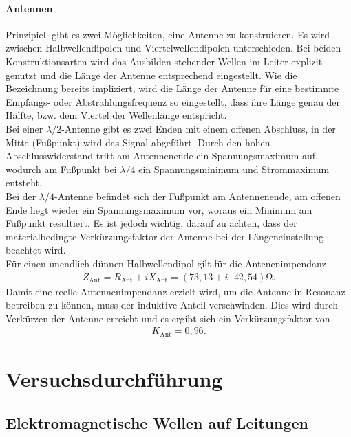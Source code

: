 \documentclass[a4paper,twoside,final]{article}
\begin{document}
\paragraph{Antennen}
Prinzipiell gibt es zwei Möglichkeiten, eine Antenne zu konstruieren. Es wird zwischen Halbwellendipolen und Viertelwellendipolen unterschieden. Bei beiden Konstruktionsarten wird das Ausbilden stehender Wellen im Leiter explizit genutzt und die Länge der Antenne entsprechend eingestellt. Wie die Bezeichnung bereits impliziert, wird die Länge der Antenne für eine bestimmte Empfangs- oder Abstrahlungsfrequenz so eingestellt, dass ihre Länge genau der Hälfte, bzw. dem Viertel der Wellenlänge entspricht.\\
Bei einer $\lambda/2$-Antenne gibt es zwei Enden mit einem offenen Abschluss, in der Mitte (Fußpunkt) wird das Signal abgeführt. Durch den hohen Abschlusswiderstand tritt am Antennenende ein Spannungsmaximum auf, wodurch am Fußpunkt bei $\lambda/4$ ein Spannungsminimum und Strommaximum entsteht.\\
Bei der $\lambda/4$-Antenne befindet sich der Fußpunkt am Antennenende, am offenen Ende liegt wieder ein Spannungsmaximum vor, woraus ein Minimum am Fußpunkt resultiert. Es ist jedoch wichtig, darauf zu achten, dass der materialbedingte Verkürzungsfaktor der Antenne bei der Längeneinstellung beachtet wird.\\
Für einen unendlich dünnen Halbwellendipol gilt für die Antenenimpendanz
\begin{align}
  Z_\text{Ant} = R_\text{Ant} + i X_\text{Ant} = (73,13 + i\cdot 42,54)\si{\ohm}.
\end{align}
Damit eine reelle Antennenimpendanz erzielt wird, um die Antenne in Resonanz betreiben zu können, muss der induktive Anteil verschwinden. Dies wird durch Verkürzen der Antenne erreicht und es ergibt sich ein Verkürzungsfaktor von
\begin{align}
  K_\text{Ant} = 0,96.
\end{align}
\section{Versuchsdurchführung} \label{sec:Versuchsdurchführung}
\subsection{Elektromagnetische Wellen auf Leitungen}
\end{document}

